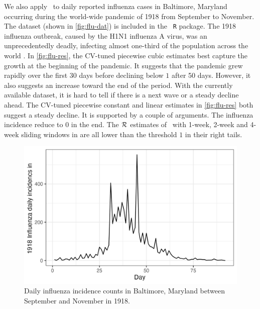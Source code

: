 We also apply \RtEstim\ to daily reported influenza cases in Baltimore, Maryland
occurring during the world-wide pandemic of 1918 from September to November. 
The dataset (shown in \autoref{fig:flu-dat}) is included in the \EpiEstim\ \texttt{R} package. 
The 1918 influenza outbreak, caused by the H1N1 influenza A virus, was an unprecedentedly
deadly, infecting almost one-third of the population across the world
\citep{taubenberger20061918}. In \autoref{fig:flu-res}, the CV-tuned piecewise
cubic estimates best capture the growth at the beginning of the pandemic. It
suggests that the pandemic grew rapidly over the first 30 days before
declining below $1$ after 50 days. However, it also suggests an
increase toward the end of the period. With the currently available dataset, it is
hard to tell if there is a next wave or a steady decline ahead. The CV-tuned piecewise 
constant and linear estimates in \autoref{fig:flu-res} both suggest a steady decline. 
It is supported by a couple of arguments. The influenza incidence reduce to $0$ in the end. 
The $\mathcal{R}$ estimates of \EpiEstim\ with 1-week, 2-week and 4-week sliding windows 
in \cite{cori2013new} are all lower than the threshold $1$ in their right tails. 



\begin{figure}[tb]
    \centering
    \includegraphics[width=0.9\linewidth]{fig/flu_dat.png}
    \caption{Daily influenza incidence counts in Baltimore, Maryland between September 
    and November in 1918.} 
    \label{fig:flu-dat}
\end{figure} 

